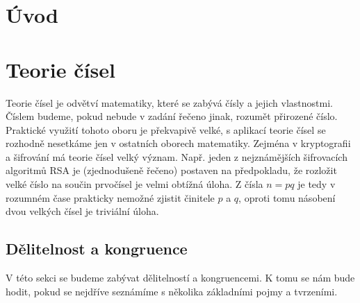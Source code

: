 \documentclass[12pt,a4paper]{report}
\begin{document}


\tableofcontents

\chapter{Úvod}

\chapter{Teorie čísel}%
Teorie čísel je odvětví matematiky, které se zabývá čísly a jejich vlastnostmi. Číslem budeme, pokud nebude v zadání řečeno jinak, rozumět přirozené číslo. 
\\  Praktické využití tohoto oboru je překvapivě velké, s aplikací teorie čísel se rozhodně nesetkáme jen v ostatních oborech matematiky. Zejména v kryptografii a šifrování má teorie čísel velký význam.	Např. jeden z nejznámějších šifrovacích algoritmů RSA je (zjednodušeně řečeno) postaven na předpokladu, že rozložit velké číslo na součin prvočísel je velmi obtížná úloha. Z čísla $n = pq$ je tedy v rozumném čase prakticky nemožné zjistit činitele $p$ a $q$, oproti tomu násobení dvou velkých čísel je triviální úloha.

\section{Dělitelnost a kongruence}
V této sekci se budeme zabývat dělitelností a kongruencemi. K tomu se nám bude hodit, pokud se nejdříve seznámíme s několika základními pojmy a tvrzeními. 
\end{document}
